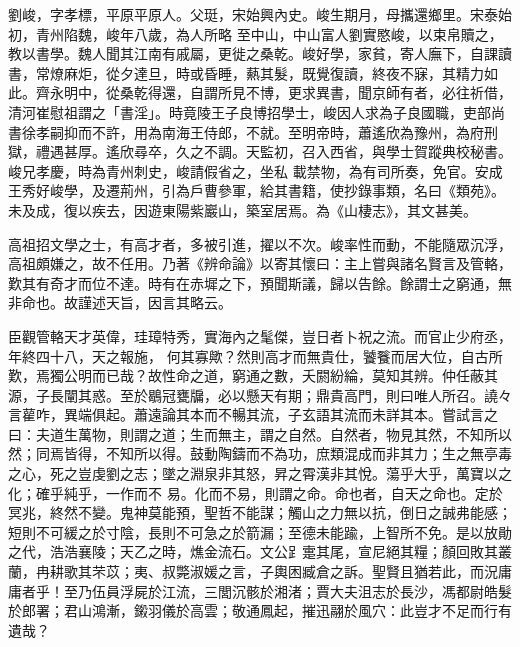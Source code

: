 
\begin{pinyinscope}

 劉峻，字孝標，平原平原人。父珽，宋始興內史。峻生期月，母攜還鄉里。宋泰始初，青州陷魏，峻年八歲，為人所略
 至中山，中山富人劉實愍峻，以束帛贖之，教以書學。魏人聞其江南有戚屬，更徙之桑乾。峻好學，家貧，寄人廡下，自課讀書，常燎麻炬，從夕達旦，時或昏睡，爇其髮，既覺復讀，終夜不寐，其精力如此。齊永明中，從桑乾得還，自謂所見不博，更求異書，聞京師有者，必往祈借，清河崔慰祖謂之「書淫」。時竟陵王子良博招學士，峻因人求為子良國職，吏部尚書徐孝嗣抑而不許，用為南海王侍郎，不就。至明帝時，蕭遙欣為豫州，為府刑獄，禮遇甚厚。遙欣尋卒，久之不調。天監初，召入西省，與學士賀蹤典校秘書。峻兄孝慶，時為青州刺史，峻請假省之，坐私
 載禁物，為有司所奏，免官。安成王秀好峻學，及遷荊州，引為戶曹參軍，給其書籍，使抄錄事類，名曰《類苑》。未及成，復以疾去，因遊東陽紫巖山，築室居焉。為《山棲志》，其文甚美。



 高祖招文學之士，有高才者，多被引進，擢以不次。峻率性而動，不能隨眾沉浮，高祖頗嫌之，故不任用。乃著《辨命論》以寄其懷曰：主上嘗與諸名賢言及管輅，歎其有奇才而位不達。時有在赤墀之下，預聞斯議，歸以告餘。餘謂士之窮通，無非命也。故謹述天旨，因言其略云。



 臣觀管輅天才英偉，珪璋特秀，實海內之髦傑，豈日者卜祝之流。而官止少府丞，年終四十八，天之報施，
 何其寡歟？然則高才而無貴仕，饕餮而居大位，自古所歎，焉獨公明而已哉？故性命之道，窮通之數，夭閼紛綸，莫知其辨。仲任蔽其源，子長闡其惑。至於鶡冠甕牖，必以懸天有期；鼎貴高門，則曰唯人所召。譊々言雚咋，異端俱起。蕭遠論其本而不暢其流，子玄語其流而未詳其本。嘗試言之曰：夫道生萬物，則謂之道；生而無主，謂之自然。自然者，物見其然，不知所以然；同焉皆得，不知所以得。鼓動陶鑄而不為功，庶類混成而非其力；生之無亭毒之心，死之豈虔劉之志；墜之淵泉非其怒，昇之霄漢非其悅。蕩乎大乎，萬寶以之化；確乎純乎，一作而不
 易。化而不易，則謂之命。命也者，自天之命也。定於冥兆，終然不變。鬼神莫能預，聖哲不能謀；觸山之力無以抗，倒日之誠弗能感；短則不可緩之於寸陰，長則不可急之於箭漏；至德未能踰，上智所不免。是以放勛之代，浩浩襄陵；天乙之時，燋金流石。文公𧾷疐其尾，宣尼絕其糧；顏回敗其叢蘭，冉耕歌其芣苡；夷、叔斃淑媛之言，子輿困臧倉之訴。聖賢且猶若此，而況庸庸者乎！至乃伍員浮屍於江流，三閭沉骸於湘渚；賈大夫沮志於長沙，馮都尉皓髮於郎署；君山鴻漸，鎩羽儀於高雲；敬通鳳起，摧迅翮於風穴：此豈才不足而行有遺哉？




\end{pinyinscope}
